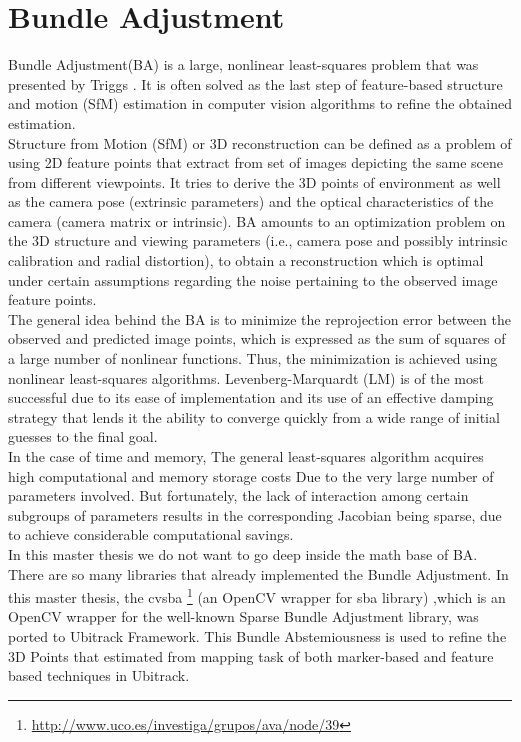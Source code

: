 \chapter{Bundle Adjustment}\label{chapter:Bundle Adjustment}
Bundle Adjustment(BA) is a large, nonlinear least-squares problem that was presented by Triggs \cite{triggs2000bundle}. It is often solved as the last step of feature-based structure and motion (SfM) estimation in computer vision algorithms to refine the obtained estimation.\\
Structure from Motion (SfM) or 3D reconstruction can be defined as a problem of using 2D feature points that extract from  set of images depicting the same scene from different viewpoints. It tries to derive the 3D points of environment as well as the camera pose (extrinsic parameters) and the optical characteristics of the camera (camera matrix or intrinsic).
BA amounts to an optimization problem on the 3D structure and viewing parameters (i.e., camera pose and possibly intrinsic
calibration and radial distortion), to obtain a reconstruction which is optimal under certain assumptions regarding the noise pertaining to the observed image feature points. \\
The general idea behind the BA is to minimize the reprojection error between the observed and predicted image points, which is expressed as the sum of squares of a large number of nonlinear functions. Thus, the minimization is achieved using nonlinear least-squares algorithms. Levenberg-Marquardt (LM) is of the most successful due to its ease of implementation and its use of an effective damping strategy that lends it the ability to converge quickly from a wide range of initial guesses to the final goal.\\
In the case of time and memory, The general least-squares algorithm acquires high computational and memory storage costs Due to the very large number of parameters involved. But fortunately, the lack of interaction among certain subgroups of parameters results in the corresponding Jacobian being sparse, due to achieve considerable computational savings.\\
In this master thesis we do not want to go deep inside the math base of BA. There are so many libraries that already implemented the Bundle Adjustment. In this master thesis, the cvsba \footnote{\url{http://www.uco.es/investiga/grupos/ava/node/39}} (an OpenCV wrapper for sba library) ,which is an OpenCV wrapper for the well-known Sparse Bundle Adjustment library, was ported to Ubitrack Framework. This Bundle Abstemiousness is used to refine the 3D Points that estimated from mapping task of both marker-based and feature based techniques in Ubitrack.\\
